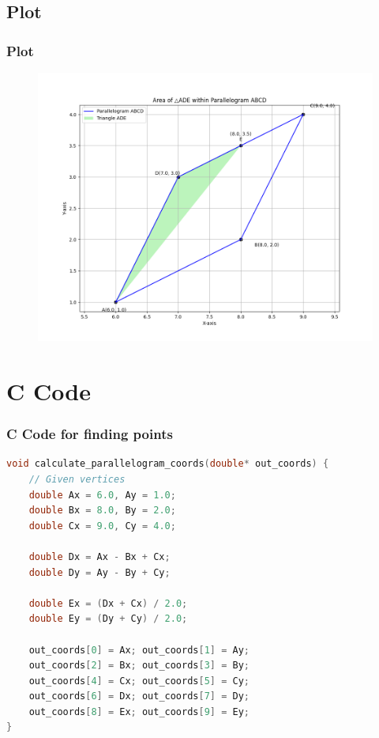 \documentclass{beamer}
\theoremstyle{remark}
\numberwithin{equation}{section}
\begin{document}
\subsection{Plot}
\begin{frame}[fragile]
\frametitle{Plot}

\begin{figure}[h!]
   \centering
   \includegraphics[width=0.7\columnwidth]{figs/fig1.png}
	\caption{}
   \label{stemplot}
\end{figure}
\end{frame}

\section{C Code}
\begin{frame}[fragile]
\frametitle{C Code for finding points}
\begin{lstlisting}[language=C]
void calculate_parallelogram_coords(double* out_coords) {
    // Given vertices
    double Ax = 6.0, Ay = 1.0;
    double Bx = 8.0, By = 2.0;
    double Cx = 9.0, Cy = 4.0;
    
    double Dx = Ax - Bx + Cx;
    double Dy = Ay - By + Cy;

    double Ex = (Dx + Cx) / 2.0;
    double Ey = (Dy + Cy) / 2.0;
  
    out_coords[0] = Ax; out_coords[1] = Ay;
    out_coords[2] = Bx; out_coords[3] = By;
    out_coords[4] = Cx; out_coords[5] = Cy;
    out_coords[6] = Dx; out_coords[7] = Dy;
    out_coords[8] = Ex; out_coords[9] = Ey;
}
    \end{lstlisting}
\end{frame}
\end{document}
